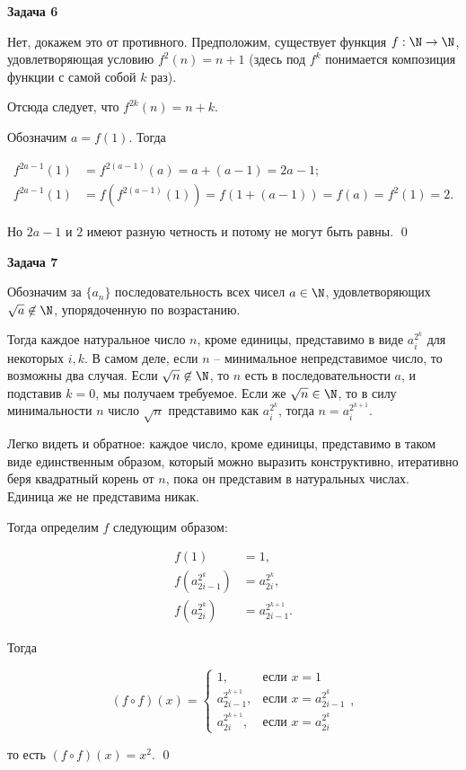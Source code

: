 \begin{center}
    \textbf{Задача 6}
\end{center}        Нет, докажем это от противного. Предположим, существует функция $f: \N \to \N$, удовлетворяющая условию $f^2(n) = n + 1$ (здесь под $f^k$ понимается композиция функции с самой собой $k$ раз).

Отсюда следует, что $f^{2k}(n) = n + k$.

Обозначим $a = f(1)$. Тогда

\begin{align*}
    f^{2a-1}(1) &= f^{2(a-1)}(a) = a + (a - 1) = 2a - 1; \\
    f^{2a-1}(1) &= f(f^{2(a-1)}(1)) = f(1 + (a - 1)) = f(a) = f^2(1) = 2.
\end{align*}

Но $2a - 1$ и $2$ имеют разную четность и потому не могут быть равны. \qed

\begin{center}
    \textbf{Задача 7}
\end{center}        Обозначим за $\{a_n\}$ последовательность всех чисел $a \in \N$, удовлетворяющих $\sqrt{a} \not\in \N$, упорядоченную по возрастанию.

Тогда каждое натуральное число $n$, кроме единицы, представимо в виде $a_i^{2^k}$ для некоторых $i, k$. В самом деле, если $n$ -- минимальное непредставимое число, то возможны два случая. Если $\sqrt{n} \not\in \N$, то $n$ есть в последовательности $a$, и подставив $k = 0$, мы получаем требуемое. Если же $\sqrt{n} \in \N$, то в силу минимальности $n$ число $\sqrt{n}$ представимо как $a_i^{2^k}$, тогда $n = a_i^{2^{k+1}}$.

Легко видеть и обратное: каждое число, кроме единицы, представимо в таком виде единственным образом, который можно выразить конструктивно, итеративно беря квадратный корень от $n$, пока он представим в натуральных числах. Единица же не представима никак.

Тогда определим $f$ следующим образом:

\begin{align*}
    f(1) &= 1, \\
    f \left( a_{2i-1}^{2^k} \right) &= a_{2i}^{2^k}, \\
    f \left( a_{2i}^{2^k} \right) &= a_{2i-1}^{2^{k+1}}.
\end{align*}

Тогда

\begin{equation*}
    (f \circ f)(x) = \begin{cases}
                         1, & \text{если } x = 1 \\
                         a_{2i-1}^{2^{k+1}}, & \text{если } x = a_{2i-1}^{2^k} \\
                         a_{2i}^{2^{k+1}}, & \text{если } x = a_{2i}^{2^k}
    \end{cases},
\end{equation*}

то есть $(f \circ f)(x) = x^2$. \qed
